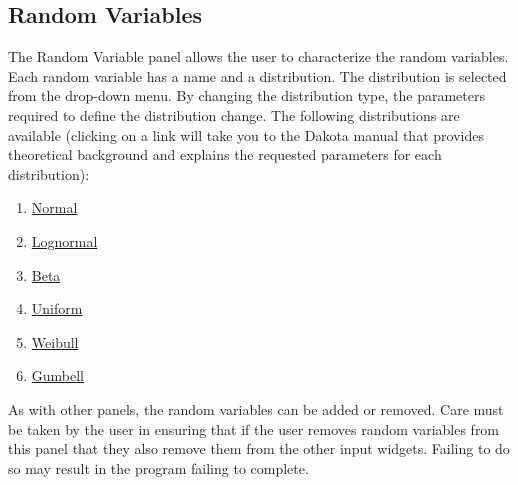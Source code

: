 \subsection{Random Variables}
The Random Variable panel allows the user to characterize the random
variables. Each random variable has a name and a distribution. The
distribution is selected from the drop-down menu. By changing the
distribution type, the parameters required to define the distribution
change. The following distributions are available (clicking on a link will take you to the Dakota manual that provides theoretical background and explains the requested parameters for each distribution):
\begin{enumerate}
\item \href{https://dakota.sandia.gov//sites/default/files/docs/6.9/html-ref/variables-normal_uncertain.html}{Normal}
\item \href{https://dakota.sandia.gov//sites/default/files/docs/6.9/html-ref/variables-lognormal_uncertain.html}{Lognormal}
\item \href{https://dakota.sandia.gov//sites/default/files/docs/6.9/html-ref/variables-beta_uncertain.html}{Beta}
\item \href{https://dakota.sandia.gov//sites/default/files/docs/6.9/html-ref/variables-uniform_uncertain.html}{Uniform}
\item \href{https://dakota.sandia.gov//sites/default/files/docs/6.9/html-ref/variables-weibull_uncertain.html}{Weibull}
\item \href{https://dakota.sandia.gov//sites/default/files/docs/6.9/html-ref/variables-gumbell_uncertain.html}{Gumbell}
\end{enumerate} 

As with other panels, the random variables can be added or
removed. Care must be taken by the user in ensuring that if the user
removes random variables from this panel that they also remove them
from the other input widgets. Failing to do so may result in the
program failing to complete.